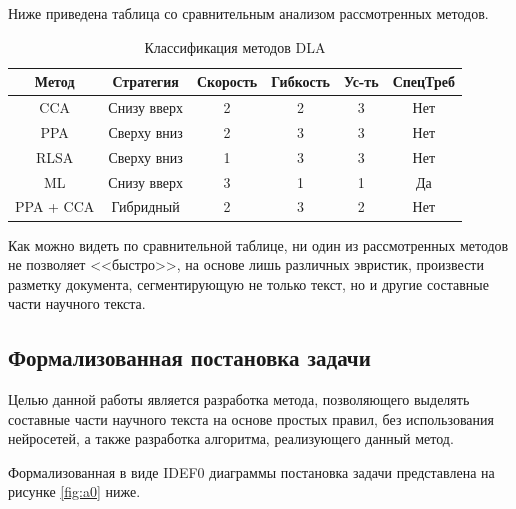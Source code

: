 Ниже приведена таблица со сравнительным анализом рассмотренных методов.

\begin{table}[H]
    \centering
    \caption{Классификация методов DLA}
    \label{tab:table}
    \begin{tabular}{|c|c|c|c|c|c|}
        \hline
        \textbf{Метод} & \textbf{Стратегия} & \textbf{Скорость} & \textbf{Гибкость} & \textbf{Ус-ть} & \textbf{СпецТреб} \\ \hline
        CCA        & Снизу вверх & 2 & 2 & 3 & Нет \\ \hline
        PPA        & Сверху вниз & 2 & 3 & 3 & Нет \\ \hline
        RLSA       & Сверху вниз & 1 & 3 & 3 & Нет \\ \hline
        ML         & Снизу вверх & 3 & 1 & 1 & Да \\ \hline
        PPA + CCA  & Гибридный   & 2 & 3 & 2 & Нет \\ \hline
    \end{tabular}
\end{table}

Как можно видеть по сравнительной таблице, ни один из рассмотренных методов не позволяет <<быстро>>, на основе лишь различных эвристик, произвести разметку документа, сегментирующую не только текст, но и другие составные части научного текста.

\newpage

\subsection{Формализованная постановка задачи}


Целью данной работы является разработка метода, позволяющего выделять составные части научного текста на основе простых правил, без использования нейросетей, а также разработка алгоритма, реализующего данный метод.

Формализованная в виде IDEF0 диаграммы постановка задачи представлена на рисунке \ref{fig:a0} ниже.


